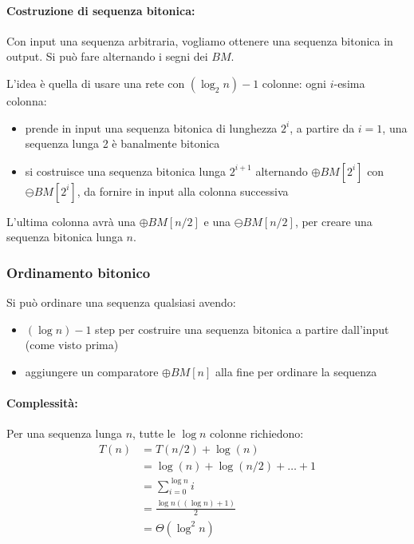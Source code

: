 \paragraph{Costruzione di sequenza bitonica:} Con input una sequenza arbitraria, vogliamo ottenere una sequenza bitonica in output. Si può fare alternando i segni dei $BM$.

L'idea è quella di usare una rete con $(\log_2 n) - 1$ colonne: ogni $i$-esima colonna:
\begin{itemize}
    \item prende in input una sequenza bitonica di lunghezza $2^i$, a partire da $i=1$, una sequenza lunga 2 è banalmente bitonica
    
    \item si costruisce una sequenza bitonica lunga $2^{i+1}$ alternando $\oplus BM[2^i]$ con $\ominus BM[2^i]$, da fornire in input alla colonna successiva
\end{itemize}

L'ultima colonna avrà una $\oplus BM [n/2]$ e una $\ominus BM [n/2]$, per creare una sequenza bitonica lunga $n$.

\subsubsection{Ordinamento bitonico}

Si può ordinare una sequenza qualsiasi avendo: 
\begin{itemize}
    \item $(\log n) - 1$ step per costruire una sequenza bitonica a partire dall'input (come visto prima)
    
    \item aggiungere un comparatore $\oplus BM [n]$ alla fine per ordinare la sequenza
\end{itemize}

\paragraph{Complessità:} Per una sequenza lunga $n$, tutte le $\log n$ colonne richiedono: 
\begin{align*}
    T(n) & = T(n/2) + \log (n) \\
    & = \log (n) + \log (n/2) + \dots + 1 \\
    & = \sum_{i=0}^{\log n} i \\
    & = \frac{\log n \left((\log n) + 1\right)}{2} \\
    & = \Theta (\log^2 n) 
\end{align*}

